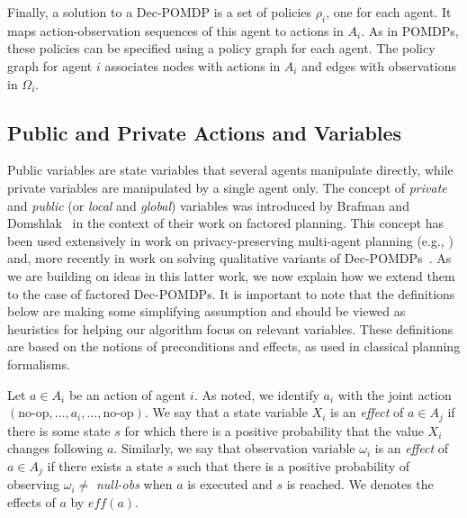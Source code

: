 \documentclass[letterpaper]{article} %
\newcommand{\eliran}[1]{\textbf{[\color{red}ELIRAN:#1]}}
\begin{document}
Finally, a solution to a Dec-POMDP is a set of policies $\rho_i$, one for each agent. It maps action-observation sequences of this agent to actions in $A_i$.
As in POMDPs, these policies can be specified using a policy graph for each agent. The policy graph for agent $i$ associates nodes with actions in $A_i$
and edges with observations in $\Omega_i$. 

\subsection{Public and Private Actions and Variables}

Public variables are state variables that several agents manipulate directly, while private variables are manipulated by a single agent only. The concept of \emph{private} and \emph{public} (or \emph{local} and \emph{global}) variables was introduced by
Brafman and Domshlak~\cite{} in the context of their work on factored planning. This concept has been used extensively
in work on privacy-preserving multi-agent planning (e.g., \cite{}) and, more recently in work on solving qualitative variants of Dec-POMDPs~\cite{}. As we are building on ideas in this latter work, we now explain how we extend them to the
case of factored Dec-POMDPs. It is important to note that the definitions below are making some simplifying assumption and should be viewed as heuristics for helping our algorithm focus on relevant variables. These definitions are based on the notions of
preconditions and effects, as used in classical planning formalisms.



Let $a\in A_i$ be an action of agent $i$. As noted, we identify $a_i$ with the joint action $(\mbox{no-op},\ldots, a_i,\ldots,\mbox{no-op})$.
We say that a state variable $X_i$ is an {\em effect} of $a\in A_j$ if there is some state $s$ for which there is a positive probability that the value 
$X_i$ changes following $a$.
Similarly, we say that observation variable $\omega_i$ is an {\em effect} of $a\in A_j$ if there exists a state $s$ such that there is a positive probability
of observing $\omega_i \neq$ {\em null-obs} when $a$ is executed and $s$ is reached. We denotes the effects of $a$ by $eff(a)$.
\end{document}
